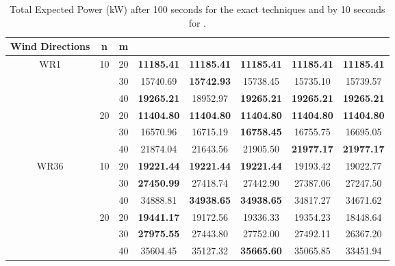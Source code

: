 \documentclass[preprint,12pt]{elsarticle}
\newcommand{\qcls}{{\sf {\small QC-LS\xspace}}}
\newcommand{\ilpls}{{\sf {\small ILP-LS\xspace}}}
\newcommand{\qcss}{{\sf {\small QC-SS\xspace}}}
\newcommand{\qulsgrb}{{\sf {\small QU-LS(GRB)\xspace}}}
\newcommand{\qulsda}{{\sf {\small QU-LS(DA)\xspace}}}
\begin{document}
\begin{table}[t!]
	\small
	\begin{tabular}{| c | c | c | c | c | c | c | c |}
		\toprule
		Wind Directions  & n  & m  & \qulsda{}  & \qulsgrb  & \qcls & \qcss  & \ilpls  \\
		\toprule
		\multirow{6}{*}{WR1}  & \multirow{3}{*}{10}       & 20       & \textbf{11185.41} & \textbf{11185.41} & \textbf{11185.41} & \textbf{11185.41} & \textbf{11185.41} \\
		& & 30   & 15740.69 & \textbf{15742.93}  & 15738.45  & 15735.10  & 15739.57     \\
		& & 40 & \textbf{19265.21} & 18952.97 & \textbf{19265.21}  & \textbf{19265.21} & \textbf{19265.21}                \\
		\cline{2-8}
		&\multirow{3}{*}{20}   & 20       & \textbf{11404.80}  & \textbf{11404.80}  & \textbf{11404.80}  & \textbf{11404.80}  & \textbf{11404.80}          \\
		&&30   & 16570.96 & 16715.19  & \textbf{16758.45}  & 16755.75 & 16695.05                  \\
		&&40   & 21874.04 & 21643.56  & 21905.50 & \textbf{21977.17} & \textbf{21977.17}        \\
		\hline
		\multirow{6}{*}{WR36} &  \multirow{3}{*}{10}    & 20       & \textbf{19221.44} & \textbf{19221.44} & \textbf{19221.44} & 19193.42 & 19022.77 \\
		&& 30  & \textbf{27450.99} & 27418.74 & 27442.90 & 27387.06 & 27247.50                     \\
		&&40   & 34888.81 & \textbf{34938.65} & \textbf{34938.65} & 34817.27  & 34671.62          \\
		\cline{2-8}
		&  \multirow{3}{*}{20}   & 20   & \textbf{19441.17}  & 19172.56 & 19336.33 & 19354.23  & 18448.64            \\
		&&30   & \textbf{27975.55} & 27443.80  & 27752.00 & 27492.11  & 26367.20                      \\
		&&40   & 35604.45 & 35127.32 & \textbf{35665.60}   & 35065.85 & 33451.94 \\
		\bottomrule                   
	\end{tabular}
	
	\vspace{0.5em}
	\caption{Total Expected Power (kW) after 100 seconds for the exact techniques and by 10 seconds for \qulsda{}.}\label{tab:results1}
\end{table}
\end{document}
